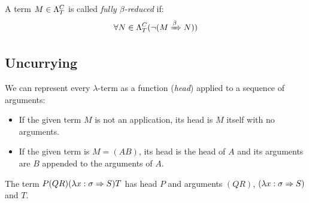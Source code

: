\documentclass[main.tex]{subfiles}
\begin{document}
\begin{defn}
    A term $M \in \plambda{T}{C}$ is called \emph{fully $\beta$-reduced} if:
    \[ \forall N \in \plambda{T}{C} (\neg (M \bbetared N)) \]
\end{defn}

\subsection{Uncurrying}
We can represent every $\lambda$-term as a function (\emph{head}) applied
to a sequence of arguments:
\begin{itemize}
    \item If the given term $M$ is not an application, its head is $M$ itself
        with no arguments.
    \item If the given term is $M = (AB)$, its head is the head of $A$ and its
        arguments are $B$ appended to the arguments of $A$.
\end{itemize}

\begin{example}
    The term $P (Q R) (\lambda x: \sigma \abstr S) T$ has head $P$ and
    arguments $(Q R)$, $(\lambda x: \sigma \abstr S)$ and $T$.
\end{example}
\end{document}
